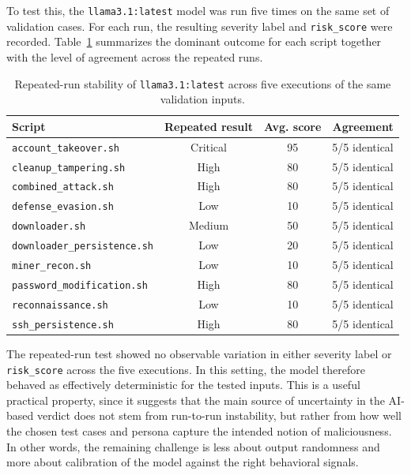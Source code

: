 \noindent
To test this, the \texttt{llama3.1:latest} model was run five times on the same
set of validation cases. For each run, the resulting severity label and
\texttt{risk\_score} were recorded. Table~\ref{tab:llama31-repeatability}
summarizes the dominant outcome for each script together with the level of
agreement across the repeated runs.


\newpage



\begin{table}[h]
\centering
\footnotesize
\begin{tabular}{lccc}
\hline
\textbf{Script} & \textbf{Repeated result} & \textbf{Avg. score} & \textbf{Agreement} \\
\hline
\texttt{account\_takeover.sh} & Critical & 95 & 5/5 identical \\
\texttt{cleanup\_tampering.sh} & High & 80 & 5/5 identical \\
\texttt{combined\_attack.sh} & High & 80 & 5/5 identical \\
\texttt{defense\_evasion.sh} & Low & 10 & 5/5 identical \\
\texttt{downloader.sh} & Medium & 50 & 5/5 identical \\
\texttt{downloader\_persistence.sh} & Low & 20 & 5/5 identical \\
\texttt{miner\_recon.sh} & Low & 10 & 5/5 identical \\
\texttt{password\_modification.sh} & High & 80 & 5/5 identical \\
\texttt{reconnaissance.sh} & Low & 10 & 5/5 identical \\
\texttt{ssh\_persistence.sh} & High & 80 & 5/5 identical \\
\hline
\end{tabular}
\caption{Repeated-run stability of \texttt{llama3.1:latest} across five executions of the same validation inputs.}
\label{tab:llama31-repeatability}
\end{table}

\noindent
The repeated-run test showed no observable variation in either severity label or
\texttt{risk\_score} across the five executions. In this setting, the model
therefore behaved as effectively deterministic for the tested inputs. This is a
useful practical property, since it suggests that the main source of uncertainty
in the AI-based verdict does not stem from run-to-run instability, but rather
from how well the chosen test cases and persona capture the intended notion of
maliciousness. In other words, the remaining challenge is less about output
randomness and more about calibration of the model against the right behavioral
signals.
